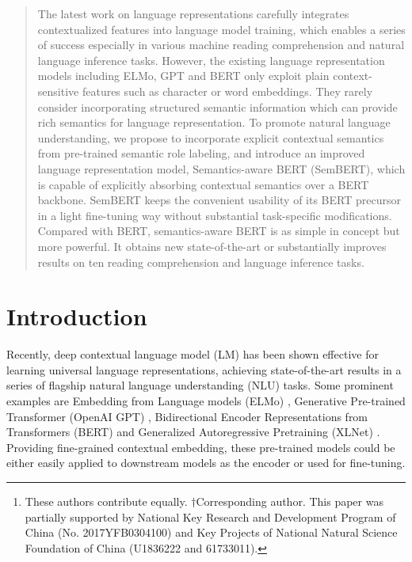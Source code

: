 \documentclass[letterpaper]{article} \usepackage{aaai20}  \usepackage{times}  \usepackage{helvet} \usepackage{courier}  \usepackage[hyphens]{url}  \usepackage{graphicx} \urlstyle{rm} \def\UrlFont{\rm}  \usepackage{graphicx}  \frenchspacing  \usepackage{amssymb}
\author{
	Zhuosheng Zhang\textsuperscript{\rm 1,2,3,\thanks{These authors contribute equally. $\dagger$Corresponding author. This paper was partially supported by National Key Research and Development Program of China (No. 2017YFB0304100) and Key Projects of National Natural Science Foundation of China (U1836222 and 61733011).}},
	Yuwei Wu\textsuperscript{\rm 1,2,3,4,*},
	Hai Zhao\textsuperscript{\rm 1,2,3,$\dagger$},
	Zuchao Li\textsuperscript{\rm 1,2,3}, \\
	\large \textbf{ 
		Shuailiang Zhang\textsuperscript{\rm 1,2,3},
		Xi Zhou\textsuperscript{\rm 5},
		Xiang Zhou\textsuperscript{\rm 5}
	}
	\\
	\textsuperscript{\rm 1}Department of Computer Science and Engineering, Shanghai Jiao Tong University\\
	\textsuperscript{\rm 2}Key Laboratory of Shanghai Education Commission for Intelligent Interaction\\
	and Cognitive Engineering, Shanghai Jiao Tong University, Shanghai, China\\
	\textsuperscript{\rm 3}MoE Key Lab of Artificial Intelligence, AI Institute, Shanghai Jiao Tong University, Shanghai, China\\
	\textsuperscript{\rm 4}College of Zhiyuan, Shanghai Jiao Tong University, China\\
	\textsuperscript{\rm 5}CloudWalk Technology, Shanghai, China\\
	{\tt \{zhangzs,will8821\}@sjtu.edu.cn, zhaohai@cs.sjtu.edu.cn} \\
}
\begin{document}
\maketitle

\begin{abstract}

	The latest work on language representations carefully integrates contextualized features into language model training, which enables a series of success especially in various machine reading comprehension and natural language inference tasks. However, the existing language representation models including ELMo, GPT and BERT only exploit plain context-sensitive features such as character or word embeddings. They rarely consider incorporating structured semantic information which can provide rich semantics for language representation. To promote natural language understanding, we propose to incorporate explicit contextual semantics from pre-trained semantic role labeling, and introduce an improved language representation model, Semantics-aware BERT (SemBERT), which is capable of explicitly absorbing contextual semantics over a BERT backbone. SemBERT keeps the convenient usability of its BERT precursor in a light fine-tuning way without substantial task-specific modifications. Compared with BERT, semantics-aware BERT is as simple in concept but more powerful. It obtains new state-of-the-art or substantially improves results on ten reading comprehension and language inference tasks. 

\end{abstract}

\section{Introduction}

Recently, deep contextual language model (LM) has been shown effective for learning universal language representations, achieving state-of-the-art results in a series of flagship natural language understanding (NLU) tasks. Some prominent examples are Embedding from Language models (ELMo) \cite{Peters2018ELMO}, Generative Pre-trained Transformer (OpenAI GPT)  \cite{radford2018improving}, Bidirectional Encoder Representations from Transformers (BERT) \cite{devlin2018bert} and Generalized Autoregressive Pretraining (XLNet) \cite{yang2019xlnet}. Providing fine-grained contextual embedding, these pre-trained models could be either easily applied to downstream models as the encoder or used for fine-tuning. 
\end{document}
